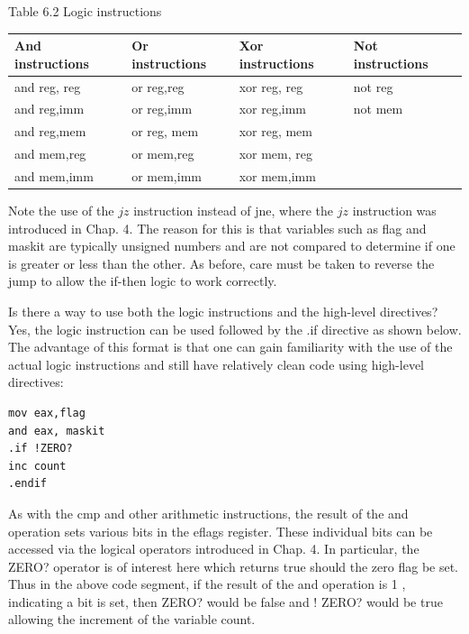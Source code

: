 \documentclass[10pt]{book}
\begin{document}
Table 6.2 Logic instructions

\begin{center}
\begin{tabular}{|llll|}
\hline
And instructions & Or instructions & Xor instructions & Not instructions \\
\hline
and reg, reg & or reg,reg & xor reg, reg & not reg \\
and reg,imm & or reg,imm & xor reg,imm & not mem \\
and reg,mem & or reg, mem & xor reg, mem &  \\
and mem,reg & or mem,reg & xor mem, reg &  \\
and mem,imm & or mem,imm & xor mem,imm &  \\
\hline
\end{tabular}
\end{center}

Note the use of the $j z$ instruction instead of jne, where the $j z$ instruction was introduced in Chap. 4. The reason for this is that variables such as flag and maskit are typically unsigned numbers and are not compared to determine if one is greater or less than the other. As before, care must be taken to reverse the jump to allow the if-then logic to work correctly.


Is there a way to use both the logic instructions and the high-level directives? Yes, the logic instruction can be used followed by the .if directive as shown below. The advantage of this format is that one can gain familiarity with the use of the actual logic instructions and still have relatively clean code using high-level directives:

\begin{verbatim}
mov eax,flag
and eax, maskit
.if !ZERO?
inc count
.endif
\end{verbatim}

As with the cmp and other arithmetic instructions, the result of the and operation sets various bits in the eflags register. These individual bits can be accessed via the logical operators introduced in Chap. 4. In particular, the ZERO? operator is of interest here which returns true should the zero flag be set. Thus in the above code segment, if the result of the and operation is 1 , indicating a bit is set, then ZERO? would be false and ! ZERO? would be true allowing the increment of the variable count.
\end{document}
